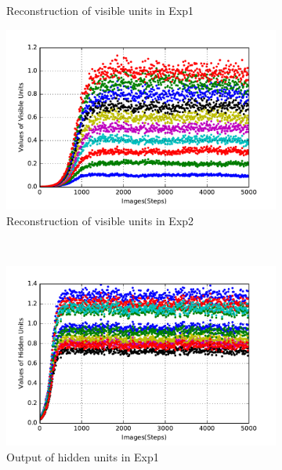 \begin{figure}
\begin{subfigure}[t]{0.4\textwidth}
		\caption{Reconstruction of visible units in Exp1}
	\end{subfigure}
	\begin{subfigure}[t]{0.4\textwidth}
		\includegraphics[width=\textwidth]{pics_sdlm/21_exp_AE_noise/exp2_recon_s.pdf}
		\caption{Reconstruction of visible units in Exp2}
	\end{subfigure}\\
	\begin{subfigure}[t]{0.4\textwidth}
		\includegraphics[width=\textwidth]{pics_sdlm/21_exp_AE_noise/exp1_hid_s.pdf}
		\caption{Output of hidden units in Exp1}
	\end{subfigure}
	\begin{subfigure}[t]{0.4\textwidth}

\end{subfigure}
\end{figure}
